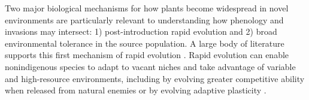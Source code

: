 \documentclass[11pt]{article}\usepackage[]{graphicx}\usepackage[]{color}
\begin{document}
Two major biological mechanisms for how plants become widespread in novel environments are particularly relevant to understanding how phenology and invasions may intersect: 1) post-introduction rapid evolution and 2) broad environmental tolerance in the source population. A large body of literature supports this first mechanism of rapid evolution \parencite[e.g.,][]{Reznick2001, Prentis2008,Colautti2015,Lee2002invasion,Clements2011}.  Rapid evolution can enable nonindigenous species to adapt to vacant niches and take advantage of variable and high-resource environments, including by evolving greater competitive ability when released from natural enemies \parencite{Blossey1995,Bossdorf2005} or by evolving adaptive plasticity \parencite{Richards2006}. %
	
\end{document}

